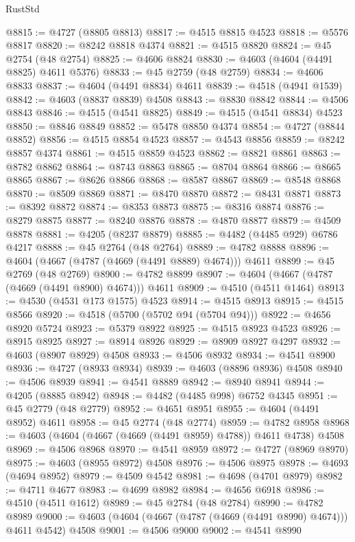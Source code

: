\begin{lexlean}{RustStd}
\begin{coremodule}
@8815 := @4727 (@8805 @8813)
@8817 := @4515 @8815 @4523
@8818 := @5576 @8817
@8820 := @8242 @8818 @4374
@8821 := @4515 @8820
@8824 := @45 @2754 (@48 @2754)
@8825 := @4606 @8824
@8830 := @4603 (@4604 (@4491 @8825) @4611 @5376)
@8833 := @45 @2759 (@48 @2759)
@8834 := @4606 @8833
@8837 := @4604 (@4491 @8834) @4611
@8839 := @4518 (@4941 @1539)
@8842 := @4603 (@8837 @8839) @4508
@8843 := @8830 @8842
@8844 := @4506 @8843
@8846 := @4515 (@4541 @8825)
@8849 := @4515 (@4541 @8834) @4523
@8850 := @8846 @8849
@8852 := @5478 @8850 @4374
@8854 := @4727 (@8844 @8852)
@8856 := @4515 @8854 @4523
@8857 := @4543 @8856
@8859 := @8242 @8857 @4374
@8861 := @4515 @8859 @4523
@8862 := @8821 @8861
@8863 := @8782 @8862
@8864 := @8743 @8863
@8865 := @8704 @8864
@8866 := @8665 @8865
@8867 := @8626 @8866
@8868 := @8587 @8867
@8869 := @8548 @8868
@8870 := @8509 @8869
@8871 := @8470 @8870
@8872 := @8431 @8871
@8873 := @8392 @8872
@8874 := @8353 @8873
@8875 := @8316 @8874
@8876 := @8279 @8875
@8877 := @8240 @8876
@8878 := @4870 @8877
@8879 := @4509 @8878
@8881 := @4205 (@8237 @8879)
@8885 := @4482 (@4485 @929) @6786 @4217
@8888 := @45 @2764 (@48 @2764)
@8889 := @4782 @8888
@8896 := @4604 (@4667 (@4787 (@4669 (@4491 @8889) @4674))) @4611
@8899 := @45 @2769 (@48 @2769)
@8900 := @4782 @8899
@8907 := @4604 (@4667 (@4787 (@4669 (@4491 @8900) @4674))) @4611
@8909 := @4510 (@4511 @1464)
@8913 := @4530 (@4531 @173 @1575) @4523
@8914 := @4515 @8913
@8915 := @4515 @8566
@8920 := @4518 (@5700 (@5702 @94 (@5704 @94)))
@8922 := @4656 @8920 @5724
@8923 := @5379 @8922
@8925 := @4515 @8923 @4523
@8926 := @8915 @8925
@8927 := @8914 @8926
@8929 := @8909 @8927 @4297
@8932 := @4603 (@8907 @8929) @4508
@8933 := @4506 @8932
@8934 := @4541 @8900
@8936 := @4727 (@8933 @8934)
@8939 := @4603 (@8896 @8936) @4508
@8940 := @4506 @8939
@8941 := @4541 @8889
@8942 := @8940 @8941
@8944 := @4205 (@8885 @8942)
@8948 := @4482 (@4485 @998) @6752 @4345
@8951 := @45 @2779 (@48 @2779)
@8952 := @4651 @8951
@8955 := @4604 (@4491 @8952) @4611
@8958 := @45 @2774 (@48 @2774)
@8959 := @4782 @8958
@8968 := @4603 (@4604 (@4667 (@4669 (@4491 @8959) @4788)) @4611 @4738) @4508
@8969 := @4506 @8968
@8970 := @4541 @8959
@8972 := @4727 (@8969 @8970)
@8975 := @4603 (@8955 @8972) @4508
@8976 := @4506 @8975
@8978 := @4693 (@4694 @8952)
@8979 := @4509 @4542
@8981 := @4698 (@4701 @8979)
@8982 := @4711 @4677
@8983 := @4699 @8982
@8984 := @4656 @6918
@8986 := @4510 (@4511 @1612)
@8989 := @45 @2784 (@48 @2784)
@8990 := @4782 @8989
@9000 := @4603 (@4604 (@4667 (@4787 (@4669 (@4491 @8990) @4674))) @4611 @4542) @4508
@9001 := @4506 @9000
@9002 := @4541 @8990

\end{coremodule}
\end{lexlean}
